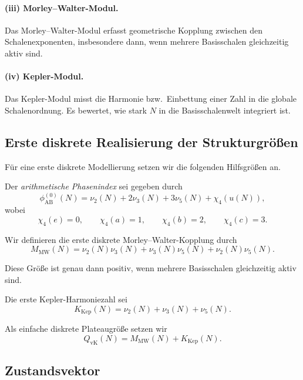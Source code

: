 \paragraph{(iii) Morley--Walter-Modul.}
Das Morley--Walter-Modul erfasst geometrische Kopplung zwischen den Schalenexponenten, insbesondere dann, wenn mehrere Basisschalen gleichzeitig aktiv sind.

\paragraph{(iv) Kepler-Modul.}
Das Kepler-Modul misst die Harmonie bzw.\ Einbettung einer Zahl in die globale Schalenordnung. 
Es bewertet, wie stark \(N\) in die Basisschalenwelt integriert ist.

\subsection{Erste diskrete Realisierung der Strukturgrößen}

Für eine erste diskrete Modellierung setzen wir die folgenden Hilfsgrößen an.

\begin{definition}[AB-Index]
	Der \emph{arithmetische Phasenindex} sei gegeben durch
	\[
	\phi_{\mathrm{AB}}^{(0)}(N)
	=
	\nu_2(N)+2\nu_3(N)+3\nu_5(N)+\chi_4(u(N)),
	\]
	wobei
	\[
	\chi_4(e)=0,\qquad
	\chi_4(a)=1,\qquad
	\chi_4(b)=2,\qquad
	\chi_4(c)=3.
	\]
\end{definition}

\begin{definition}
	Wir definieren die erste diskrete Morley--Walter-Kopplung durch
	\[
	M_{\mathrm{MW}}(N)
	=
	\nu_2(N)\nu_3(N)+\nu_3(N)\nu_5(N)+\nu_2(N)\nu_5(N).
	\]
\end{definition}

Diese Größe ist genau dann positiv, wenn mehrere Basisschalen gleichzeitig aktiv sind.

\begin{definition}
	Die erste Kepler-Harmoniezahl sei
	\[
	K_{\mathrm{Kep}}(N)
	=
	\nu_2(N)+\nu_3(N)+\nu_5(N).
	\]
\end{definition}

\begin{definition}
	Als einfache diskrete Plateaugröße setzen wir
	\[
	Q_{\mathrm{vK}}(N)
	=
	M_{\mathrm{MW}}(N)+K_{\mathrm{Kep}}(N).
	\]
\end{definition}

\subsection{Zustandsvektor}

